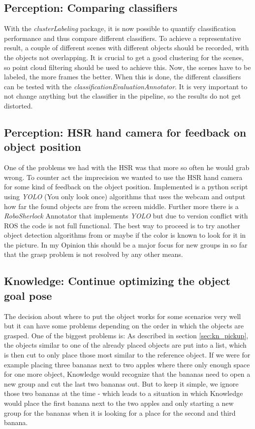 \documentclass[main.tex]{subfiles}
\begin{document}
		\subsection{Perception: Comparing classifiers}
		With the \textit{clusterLabeling} package, it is now possible to quantify classification performance and thus compare different classifiers. To achieve a 					representative result, a couple of different scenes with different objects should be recorded, with the objects not overlapping. It is crucial to get a
		good clustering for the scenes, so point cloud filtering should be used to achieve this. Now, the scenes have to be labeled, the more frames the better. 
		When this is done, the different classifiers can be tested with the \textit{classificationEvaluationAnnotator}. It is very important to not change anything but 
		the classifier in the pipeline, so the results do not get distorted.
		
		\subsection{Perception: HSR hand camera for feedback on object position}
One of the problems we had with the HSR was that more so often he would grab wrong.
To counter act the imprecision we wanted to use the HSR hand camera for some kind of feedback on the object position.
Implemented is a python script using \textit{YOLO} (You only look once) algorithms that uses the webcam and output how far the found objects are from the screen middle.
Further more there is a \textit{RoboSherlock} Annotator that implements \textit{YOLO} but due to version conflict with ROS the code is not full functional.
The best way to proceed is to try another object detection algorithms from  or maybe if the color is known to look for it in the picture.
In my Opinion this should be a major focus for new groups in so far that the grasp problem is not resolved by any other means.

		\subsection{Knowledge: Continue optimizing the object goal pose}
		The decision about where to put the object works for some scenarios very well but it can have some problems depending on the order in which the objects are grasped. One of the biggest problems is: As described in section \ref{sec:kn_pickup}, the objects  similar to one of the already placed objects are put into a list, which is then cut to only place those most similar to the reference object. If we were for example placing three bananas next to two apples where there only enough space for one more object, Knowledge would recognize that the bananas need to open a new group and cut the last two bananas out. But to keep it simple, we ignore those two bananas at the time - which leads to a situation in which Knowledge would place the first banana next to the two apples and only starting a new group for the bananas when it is looking for a place for the second and third banana.
	  	
\end{document}
